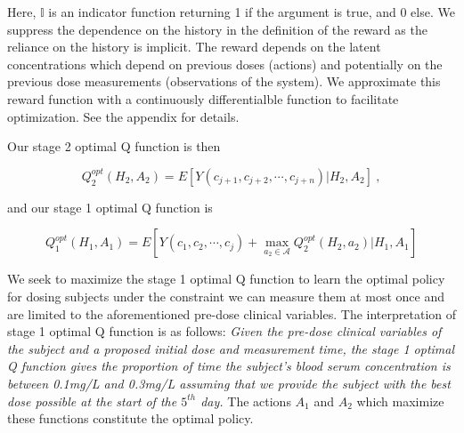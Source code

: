 \noindent Here, $ \mathbb{I} $ is an indicator function returning 1 if the argument is true, and 0 else.  
%
We suppress the dependence on the history in the definition of the reward as the reliance on the history is implicit.  The reward depends on the latent concentrations which depend on previous doses (actions) and potentially on the previous dose measurements (observations of the system).  We approximate this reward function with a continuously differentialble function to facilitate optimization.  See the appendix for details.  

Our stage 2 optimal Q function is then

\begin{equation}
Q_{2}^{o p t}\left(H_{2}, A_{2}\right)=E\left[Y\left(c_{j+1}, c_{j+2}, \cdots, c_{j+n}\right) \Bigg\vert H_{2}, A_{2}\right] \>,
\end{equation}

\noindent and our stage 1 optimal Q function is

\begin{equation}
Q_{1}^{o p t}\left(H_{1}, A_{1}\right)= E \left[Y\left(c_{1}, c_{2}, \cdots, c_{j}\right)+\max _{a_{2} \in \mathscr{A}} Q_{2}^{o p t}\left(H_{2}, a_{2}\right) \Bigg\vert H_{1}, A_{1}\right]
\end{equation}

We seek to maximize the stage 1 optimal Q function to learn the optimal policy for dosing subjects under the constraint we can measure them at most once and are limited to the aforementioned pre-dose clinical variables.  The interpretation of stage 1 optimal Q function is as follows:\textit{ Given the pre-dose clinical variables of the subject and a proposed initial dose and measurement time, the stage 1 optimal Q function gives the proportion of time the subject’s blood serum concentration is between 0.1mg/L and 0.3mg/L assuming that we provide the subject with the best dose possible at the start of the $ 5^{th} $ day.}  The actions $ A_1 $ and $ A_2 $ which maximize these functions constitute the optimal policy.

